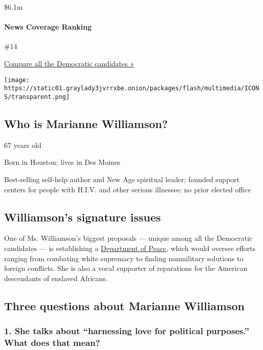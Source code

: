 \$6.1m

\hypertarget{news-coverage-ranking}{%
\paragraph{News Coverage Ranking}\label{news-coverage-ranking}}

\#14

\href{https://www.nytimes3xbfgragh.onion/interactive/2020/us/elections/democratic-polls.html}{Compare
all the Democratic candidates »}

\texttt{[image: https://static01.graylady3jvrrxbe.onion/packages/flash/multimedia/ICONS/transparent.png]}

\hypertarget{who-is-marianne-williamson}{%
\subsection{Who is Marianne
Williamson?}\label{who-is-marianne-williamson}}

67 years old

Born in Houston; lives in Des Moines

Best-selling self-help author and New Age spiritual leader; founded
support centers for people with H.I.V. and other serious illnesses; no
prior elected office

\hypertarget{williamsons-signature-issues}{%
\subsection{Williamson's signature
issues}\label{williamsons-signature-issues}}

One of Ms. Williamson's biggest proposals --- unique among all the
Democratic candidates --- is establishing a
\href{https://www.marianne2020.com/posts/join-us-to-build-a-u-s-department-of-peace}{Department
of Peace}, which would oversee efforts ranging from combating white
supremacy to finding nonmilitary solutions to foreign conflicts. She is
also a vocal supporter of reparations for the American descendants of
enslaved Africans.

\hypertarget{three-questions-about-marianne-williamson}{%
\subsection{Three questions about Marianne
Williamson}\label{three-questions-about-marianne-williamson}}

\hypertarget{1-she-talks-about-harnessing-love-for-political-purposes-what-does-that-mean}{%
\subsubsection{\texorpdfstring{\textbf{1. She talks about ``harnessing
love for political purposes.'' What does that
mean?}}{1. She talks about ``harnessing love for political purposes.'' What does that mean?}}\label{1-she-talks-about-harnessing-love-for-political-purposes-what-does-that-mean}}

